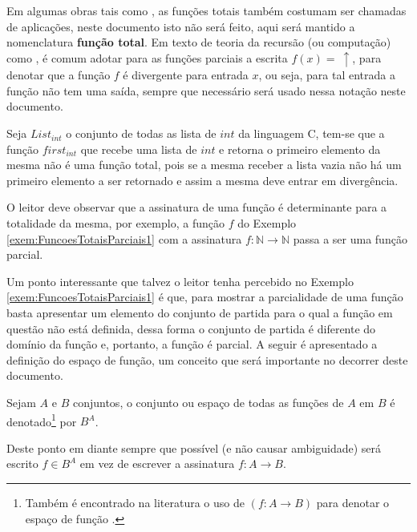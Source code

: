 Em algumas obras tais como \cite{carmo2013}, as funções totais também costumam ser chamadas de aplicações, neste documento isto não será feito, aqui será mantido a nomenclatura \textbf{função total}. Em texto de teoria da recursão (ou computação) como \cite{bedregal2006classical}, é comum adotar para as funções parciais a escrita $f(x) = \ \uparrow$, para denotar que a função $f$ é divergente para entrada $x$, ou seja, para tal entrada a função não tem uma saída, sempre que necessário será usado nessa notação neste documento.

\begin{exemplo}\label{exem:FuncoesTotaisParciais2}
	Seja $List_{int}$ o conjunto de todas as lista de $int$ da linguagem C, tem-se que a função $first_{int}$ que recebe uma lista de $int$ e retorna o primeiro elemento da mesma não é uma função total, pois se a mesma receber a lista vazia não há um primeiro elemento a ser retornado e assim a mesma deve entrar em divergência.
\end{exemplo}

\begin{cuidado}
	O leitor deve observar que a assinatura de uma função é determinante para a totalidade da mesma, por exemplo, a função $f$ do Exemplo \ref{exem:FuncoesTotaisParciais1} com a assinatura $f: \mathbb{N} \rightarrow \mathbb{N}$ passa a ser uma função parcial.
\end{cuidado}

Um ponto interessante que talvez o leitor tenha percebido no Exemplo \ref{exem:FuncoesTotaisParciais1} é que, para mostrar a parcialidade de uma função basta apresentar um elemento do conjunto de partida para o qual a função em questão não está definida, dessa forma o conjunto de partida é diferente do domínio da função e, portanto, a função é parcial. A seguir é apresentado a definição do espaço de função, um conceito que será importante no decorrer deste documento.

\begin{definicao}\label{def:EspacoFuncao}
	Sejam $A$ e $B$ conjuntos, o conjunto ou espaço de todas as funções de $A$ em $B$ é denotado\footnote{Também é encontrado na literatura o uso de $(f: A \rightarrow B)$ para denotar o espaço de função \cite{fmcbook}.} por $B^A$.
\end{definicao}

\begin{nota}
	Deste ponto em diante sempre que possível (e não causar ambiguidade) será escrito $f \in B^A$ em vez de escrever a assinatura $f: A \rightarrow B$.
\end{nota}

